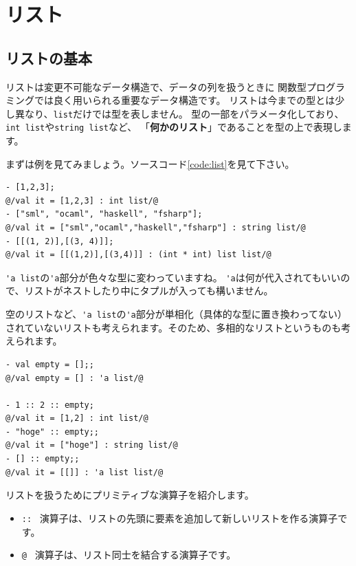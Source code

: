\documentclass[11pt,a4paper]{article}
\begin{document}
\label{sec:list}
\section{リスト}
\subsection{リストの基本}
リストは変更不可能なデータ構造で、データの列を扱うときに
関数型プログラミングでは良く用いられる重要なデータ構造です。
リストは今までの型とは少し異なり、\lstinline{list}だけでは型を表しません。
型の一部をパラメータ化しており、
\lstinline{int list}や\lstinline{string list}など、
「{\bfseries 何かのリスト}」であることを型の上で表現します。

まずは例を見てみましょう。ソースコード\ref{code:list}を見て下さい。

\begin{lstlisting}[caption=色々なリスト,label=code:list]
- [1,2,3];
@/val it = [1,2,3] : int list/@
- ["sml", "ocaml", "haskell", "fsharp"];
@/val it = ["sml","ocaml","haskell","fsharp"] : string list/@
- [[(1, 2)],[(3, 4)]];
@/val it = [[(1,2)],[(3,4)]] : (int * int) list list/@
\end{lstlisting}

\lstinline{'a list}の\lstinline{'a}部分が色々な型に変わっていますね。
\lstinline{'a}は何が代入されてもいいので、リストがネストしたり中にタプルが入っても構いません。

空のリストなど、\lstinline{'a list}の\lstinline{'a}部分が単相化（具体的な型に置き換わってない）
されていないリストも考えられます。そのため、多相的なリストというものも考えられます。

\begin{lstlisting}[caption=多相的なリスト,label=code:poly-list]
- val empty = [];;
@/val empty = [] : 'a list/@

- 1 :: 2 :: empty;
@/val it = [1,2] : int list/@
- "hoge" :: empty;;
@/val it = ["hoge"] : string list/@
- [] :: empty;;
@/val it = [[]] : 'a list list/@
\end{lstlisting}

リストを扱うためにプリミティブな演算子を紹介します。
\begin{itemize}
\item \lstinline{::} \ 演算子は、リストの先頭に要素を追加して新しいリストを作る演算子です。
\item \lstinline{@} \ 演算子は、リスト同士を結合する演算子です。
\end{itemize}
\end{document}
